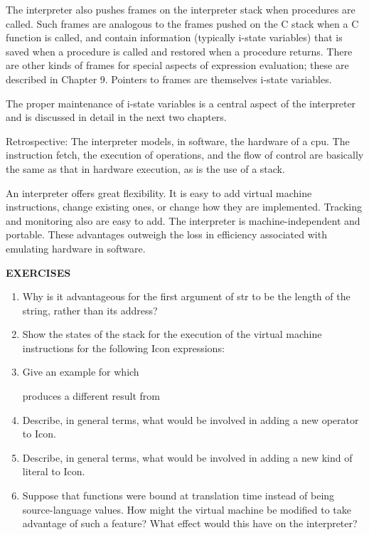 The interpreter also pushes frames on the interpreter stack when
procedures are called. Such frames are analogous to the frames pushed
on the C stack when a C function is called, and contain information
(typically i-state variables) that is saved when a procedure is called
and restored when a procedure returns. There are other kinds of frames
for special aspects of expression evaluation; these are described in
Chapter 9. Pointers to frames are themselves i-state variables.

The proper maintenance of i-state variables is a central aspect of the
interpreter and is discussed in detail in the next two chapters.

Retrospective: The interpreter models, in software, the hardware of a
cpu. The instruction fetch, the execution of operations, and the flow
of control are basically the same as that in hardware execution, as is
the use of a stack.

An interpreter offers great flexibility. It is easy to add virtual
machine instructions, change existing ones, or change how they are
implemented. Tracking and monitoring also are easy to add. The
interpreter is machine-independent and portable. These advantages
outweigh the loss in efficiency associated with emulating hardware in
software.

\bigskip

\noindent\textbf{EXERCISES}

\liststyleLvi
\begin{enumerate}
\item Why is it advantageous for the first argument of str to be the
length of the string, rather than its address?

\item Show the states of the stack for the execution of the virtual
machine instructions for the following Icon expressions:


\item Give an example for which


produces a different result from


\item Describe, in general terms, what would be involved in adding a
new operator to Icon.

\item Describe, in general terms, what would be involved in adding a
new kind of literal to Icon.

\item Suppose that functions were bound at translation time instead of
being source-language values. How might the virtual machine be
modified to take advantage of such a feature?  What effect would this
have on the interpreter?

\end{enumerate}
